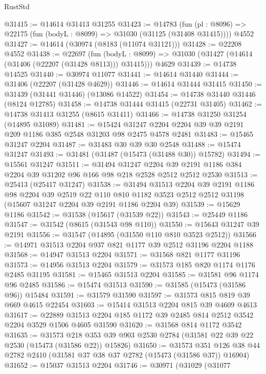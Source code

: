 \begin{lexlean}{RustStd}
\begin{coremodule}
@31415 := @14614 @31413 @31255
@31423 := @14783
    (fun (pl : @8096) => @22175 (fun (bodyL : @8099) => @31030 (@31125 (@31408 @31415))))
    @4552
@31427 := @14614 (@30974 (@8183 (@11074 @31121)))
@31428 := @22208 @4552
@31438 := @22697
    (fun (bodyL : @8099) => @31030 (@31427 (@14614 (@31406 (@22207 (@31428 @8113))) @31415)))
    @4629
@31439 := @14738 @14525
@31440 := @30974 @11077
@31441 := @14614 @31440
@31444 := @31406 (@22207 (@31428 @4629))
@31446 := @14614 @31444 @31415
@31450 := @31439 (@31441 @31446) (@13086 @14522)
@31454 := @14738 @31440 @31446 (@8124 @12785)
@31458 := @14738 @31444 @31415 (@22731 @31405)
@31462 := @14738 @31413 @31255 (@8615 @31411)
@31466 := @14738 @31250 @31254 (@14895 @31089)
@31481 := @15424 @31247 @2204 @2204 @39 @39 @2191 @209 @1186 @385 @2548 @31203 @98 @2475 @4578 @2481
@31483 := @15465 @31247 @2204
@31487 := @31483 @30 @39 @30 @2548
@31488 := @15474 @31247
@31493 := @31481 (@31487 (@15473 (@31488 @30)) @15782)
@31494 := @15561 @31247
@31511 := @31494
    @31247
    @2204
    @39
    @2191
    @1186
    @384
    @2204
    @39
    @31202
    @96
    @166
    @98
    @218
    @2528
    @2512
    @2512
    @2530
@31513 := @25413 (@25417 @31247)
@31538 := @31494
    @31513
    @2204
    @39
    @2191
    @1186
    @98
    @2204
    @39
    @2519
    @22
    @110
    @810
    @1182
    @3523
    @2512
    @2512
    @31198
    (@15607 @31247 @2204 @39 @2191 @1186 @2204 @39)
@31539 := @15629 @1186
@31542 := @31538 (@15617 (@31539 @22))
@31543 := @25449 @1186
@31547 := @31542 (@8615 (@31543 @98 @110))
@31550 := @15643 @31247 @39 @2191
@31556 := @31547 (@14895 (@31550 @110 @810 @3523 @2512))
@31566 := @14971 @31513 @2204 @937 @821 @1177 @39 @2512 @31196 @2204 @1188
@31568 := @14947 @31513 @2204
@31571 := @31568 @821 @1177 @31196
@31573 := @14956 @31513 @2204
@31579 := @31573 @185 @820 @1174 @1176 @2485 @31195
@31581 := @15465 @31513 @2204
@31585 := @31581 @96 @1174 @96 @2485
@31586 := @15474 @31513
@31590 := @31585 (@15473 (@31586 @96)) @15484
@31591 := @31579 @31590
@31597 := @31573 @815 @819 @39 @669 @4615 @22454
@31603 := @15414 @31513 @2204 @815 @39 @4609 @4613
@31617 := @22889 @31513 @2204 @185 @1172 @39 @2485 @814 @2512 @3542 @2204 @3529 @1506 @4605 @31590
@31620 := @31568 @814 @1172 @3542
@31635 := @31573
    @218
    @353
    @39
    @903
    @2530
    @2784
    (@31581 @22 @39 @22 @2530 (@15473 (@31586 @22)) @15826)
@31650 := @31573
    @351
    @126
    @38
    @44
    @2782
    @2410
    (@31581 @37 @38 @37 @2782 (@15473 (@31586 @37)) @16904)
@31652 := @15037 @31513 @2204
@31746 := @30971
    (@31029
      (@31077

\end{coremodule}
\end{lexlean}
